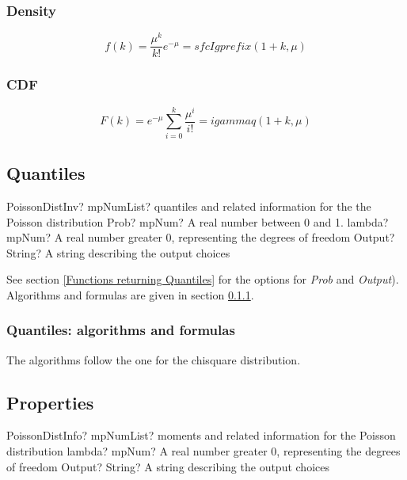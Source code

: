 \subsubsection{Density}
\label{PoissonDistributionDensity}

\begin{equation} 
	f(k)= \frac{\mu^k}{k!} e^{-\mu} = sfcIgprefix(1+k,\mu)
\end{equation}


\subsubsection{CDF}
\begin{equation} 
	F(k)=  e^{-\mu} \sum_{i=0}^k \frac{\mu^i}{i!} = igammaq(1+k,\mu)
\end{equation}




\subsection{Quantiles}

\begin{mpFunctionsExtract}
	\mpFunctionThree
	{PoissonDistInv? mpNumList? quantiles and related information for the the Poisson distribution}
	{Prob? mpNum? A real number between 0 and 1.}
	{lambda? mpNum? A real number greater 0, representing the degrees of freedom}
	{Output? String? A string describing the output choices}
\end{mpFunctionsExtract}

See section \ref{Functions returning Quantiles} for the options for  {\itshape\sffamily Prob} and {\itshape\sffamily Output}). Algorithms and formulas are given in section \ref{PoissonDistributionQuantilesAlgorithm}.

\subsubsection{Quantiles: algorithms and formulas}
\label{PoissonDistributionQuantilesAlgorithm}
The algorithms follow the one for the chisquare distribution.

\subsection{Properties}
\label{PoissonDistributionProperties}


\begin{mpFunctionsExtract}
	\mpFunctionTwo
	{PoissonDistInfo? mpNumList? moments and related information for the Poisson distribution}
	{lambda? mpNum? A real number greater 0, representing the degrees of freedom}
	{Output? String? A string describing the output choices}
\end{mpFunctionsExtract}

